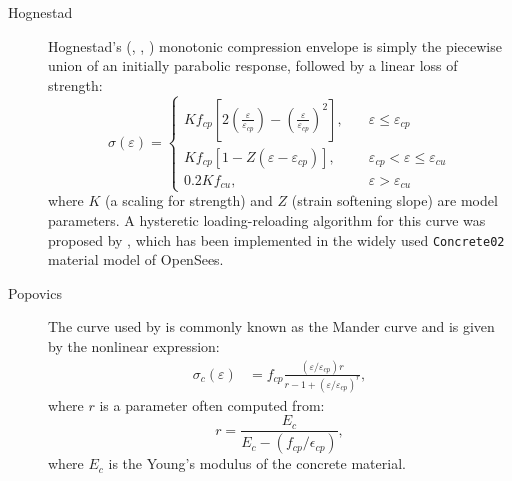 \begin{description}
\item[Hognestad]
  Hognestad's (\citet{hognestad1951study}, \citet{kent1973cyclic}, \textcite{scott1982stressstrain}) monotonic
  compression envelope is simply the piecewise union of an initially parabolic response, followed by a linear loss of strength: 
  \begin{equation}
  \sigma(\varepsilon)=\left\{\begin{aligned}
  K f_{cp}\left[2\left(\frac{\varepsilon}{\varepsilon_{cp}}\right)-\left(\frac{\varepsilon}{\varepsilon_{cp}}\right)^{2}\right], &\quad \varepsilon \leq \varepsilon_{cp} \\
  K f_{cp}\left[1-Z\left(\varepsilon-\varepsilon_{cp}\right)\right], &\quad \varepsilon_{cp}<\varepsilon \leq \varepsilon_{cu} \\
  0.2 K f_{cu}, &\quad \varepsilon > \varepsilon_{cu}
  \end{aligned}\right.
  \label{eq:hognestad}
  \end{equation}
  where $K$ (a scaling for strength) and $Z$ (strain softening slope) are model parameters. A hysteretic loading-reloading algorithm for this curve was proposed by \citet{yassin1994nonlinear}, which has been implemented in the widely used \texttt{Concrete02} material model of OpenSees.
%
\item[Popovics] The curve used by \cite{popov1978cyclic} is commonly known as the Mander curve and is given by the nonlinear expression: 
  \begin{equation}
\begin{aligned}
\sigma_c(\varepsilon) &= f_{cp}\frac{(\varepsilon/\varepsilon_{cp})r}{r-1+(\varepsilon/\varepsilon_{cp})^r},
\end{aligned}
  \label{eq:popovics}
\end{equation}
where $r$ is a parameter often computed from:
\begin{equation}
r =\frac{E_{c}}{E_{c}-\left(f_{c p} / \epsilon_{c p}\right)},
\label{eq:popovics1}
\end{equation}
where $E_c$ is the Young's modulus of the concrete material. 

\end{description}


